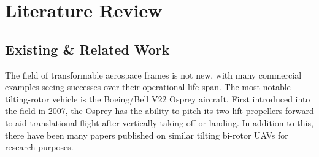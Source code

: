 \section{Literature Review}
\label{sec:intro.litreview}
\subsection{Existing \& Related Work}
\label{subsec:intro.lit.related}
The field of transformable aerospace frames is not new, with many commercial examples seeing successes over their operational life span. The most notable tilting-rotor vehicle is the Boeing/Bell V22 Osprey\cite{osprey} aircraft. First introduced into the field in 2007, the Osprey has the ability to pitch its two lift propellers forward to aid translational flight after vertically taking off or landing. In addition to this, there have been many papers published on similar tilting bi-rotor UAVs for research purposes.
